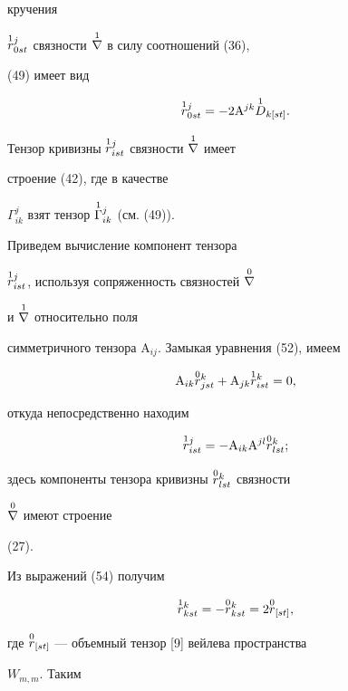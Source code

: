 кручения 


$\overset{1}{r}{}^j_{0s t}$ связности $\overset{1}{\nabla}{}$ в силу соотношений (36), 


(49) имеет вид


\begin{equation} 


\up{1}{r}^j_{0s t}=-2\mathrm A^{j k}\up{1}{D}_{k[s t]}. 


\end{equation} 


Тензор кривизны $\overset{1}{r}{}^j_{is t}$ связности $\overset{1}{\nabla}{}$ имеет 


строение (42), где в качестве 


$\Gamma^j_{i k}$ взят тензор $\overset{1}{\Gamma}{}^j_{i k}$ (см. (49)). 


Приведем вычисление компонент тензора 


$\overset{1}{r}{}^j_{is t}$, используя сопряженность связностей $\overset{0}{\nabla}{}$ 


и $\overset{1}{\nabla}{}$ относительно поля 


симметричного тензора $\mathrm A_{i j}$. Замыкая уравнения (52), имеем 


$$ 


\mathrm A_{i k}\up{0}{r}^k_{j s t}+\mathrm A_{j k} 


\up{1}{r}^k_{is t}=0, 


$$ 


откуда непосредственно находим 


\begin{equation} 


\up{1}{r}^j_{is t}=-\mathrm A_{i k}\mathrm A^{j l} 


\up{0}{r}^k_{l s t}; 


\end{equation} 


здесь компоненты тензора кривизны $\overset{0}{r}{}^k_{l s t}$ связности 


$\overset{0}{\nabla}{}$ имеют строение 


(27). 


 


Из выражений (54) получим 


$$ 


\up{1}{r}^k_{k s t}=-\up{0}{r}^k_{k s t}=2\up{0}{r}_{[s t]}, 


$$ 


где $\overset{0}{r}{}_{[s t]}$ --- объемный тензор [9] вейлева пространства 


$W_{m,m}$. Таким 


